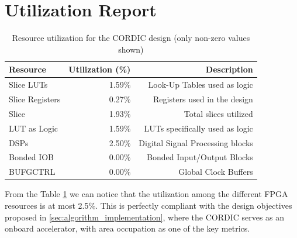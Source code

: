 \section{Utilization Report}
\begin{table}[H]
    \centering
    \small
    \captionsetup{skip=10pt} 
    \begin{tabular}{lrr}
        \hline
        Resource               & Utilization (\%) & Description \\
        \hline
        Slice LUTs             & 1.59\%           & Look-Up Tables used as logic \\
        Slice Registers        & 0.27\%           & Registers used in the design \\
        Slice                  & 1.93\%           & Total slices utilized \\
        LUT as Logic           & 1.59\%           & LUTs specifically used as logic \\
        DSPs                   & 2.50\%           & Digital Signal Processing blocks \\
        Bonded IOB             & 0.00\%           & Bonded Input/Output Blocks \\
        BUFGCTRL               & 0.00\%           & Global Clock Buffers \\
        \hline
    \end{tabular}
    \caption{Resource utilization for the CORDIC design (only non-zero values shown)}
    \label{tab:cordic_resource_utilization}
\end{table}

From the Table \ref{tab:cordic_resource_utilization} we can notice that the utilization among the different FPGA resources is at most 2.5\%. This is perfectly compliant with the design objectives proposed in \ref{sec:algorithm_implementation}, where the CORDIC serves as an onboard accelerator, with area occupation as one of the key metrics.

